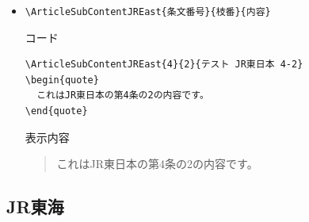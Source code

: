 \documentclass[oneside,10pt,a4paper]{jsarticle}
\begin{document}
\begin{itemize}
\begin{itembox}[l]{表示内容}
      \end{itembox}
    \item \verb|\ArticleSubContentJREast{条文番号}{枝番}{内容}|
      \begin{itembox}[l]{コード}
        \begin{verbatim}
\ArticleSubContentJREast{4}{2}{テスト JR東日本 4-2}
\begin{quote}
  これはJR東日本の第4条の2の内容です。
\end{quote}\end{verbatim}
      \end{itembox}
      \begin{itembox}[l]{表示内容}
        \begin{quote}
          これはJR東日本の第4条の2の内容です。
        \end{quote}
      \end{itembox}
  \end{itemize}

  \newpage

  \subsection{JR東海}
\end{document}
